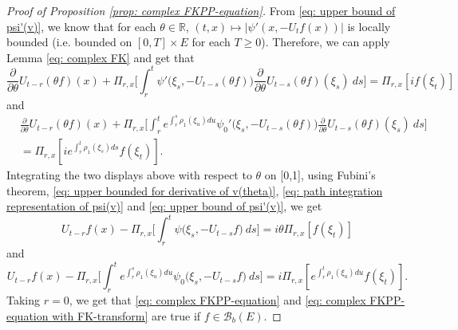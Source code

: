 \documentclass[12pt,a4paper]{amsart}
\theoremstyle{plain}
\theoremstyle{definition}
\numberwithin{equation}{section}
\begin{document}
\begin{proof}[Proof of Proposition \ref{prop: complex FKPP-equation}]
 From \eqref{eq: upper bound of psi'(v)}, we know that for each $\theta\in \mathbb R$, $(t,x) \mapsto |\psi'(x,-U_tf(x))|$ is locally bounded (i.e. bounded on $[0,T]\times E$ for each $T \geq 0$).
Therefore, we can apply Lemma \ref{eq: complex FK} and get that
\[
  \frac{\partial}{\partial \theta} U_{t-r}(\theta f)(x) + \Pi_{r,x} \Big[\int_r^t \psi'\big(\xi_s,- U_{t-s}(\theta f)\big)\frac{\partial}{\partial \theta} U_{t-s}(\theta f)(\xi_s)~ds\Big]
  = \Pi_{r,x} [i f(\xi_t)]
\]
and
\begin{align}
  & \frac{\partial}{\partial \theta} U_{t-r}(\theta f)(x) + \Pi_{r,x} \Big[\int_r^t e^{\int_r^s \rho_1(\xi_u)du}\psi_0'\big(\xi_s,- U_{t-s}(\theta f)\big)\frac{\partial}{\partial \theta} U_{t-s}(\theta f)(\xi_s)~ds\Big]\\
  & = \Pi_{r,x} [i e^{\int_r^t \rho_1(\xi_s)ds}f(\xi_t)].
\end{align}
Integrating the two displays above with respect to $\theta$  on [0,1], using
Fubini's theorem, \eqref{eq: upper bounded for derivative of v(theta)}, \eqref{eq: path integration representation of psi(v)} and \eqref{eq: upper bound of psi'(v)}, we get
\begin{equation}
  U_{t-r}f(x) - \Pi_{r,x} \Big[\int_r^t \psi\big(\xi_s,-U_{t-s}f\big) ~ds\Big]
  = i \theta \Pi_{r,x} [f(\xi_t)]
\end{equation}
and
\begin{equation}
  U_{t-r}f(x) - \Pi_{r,x} \Big[\int_r^t e^{\int_r^s \rho_1(\xi_u)du} \psi_0\big(\xi_s,- U_{t-s}f\big) ~ds\Big]
  = i \Pi_{r,x} [e^{\int_r^t\rho_1(\xi_u)du}f(\xi_t)].
\end{equation}
Taking $r = 0$, we get that \eqref{eq: complex FKPP-equation} and \eqref{eq: complex FKPP-equation with FK-transform} are true if $f\in \mathcal B_b(E)$.


\end{proof}
\end{document}
